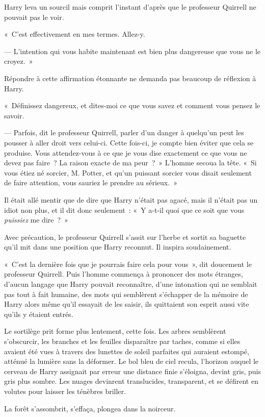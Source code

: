 Harry leva un sourcil mais comprit l'instant d'après que le professeur Quirrell ne pouvait pas le voir.

«~C'est effectivement en mes termes.
Allez-y.

--- L'intention qui vous habite maintenant est bien plus dangereuse que vous ne le croyez.~»

Répondre à cette affirmation étonnante ne demanda pas beaucoup de réflexion à Harry.

«~Définissez dangereux, et dites-moi ce que vous savez et comment vous pensez le savoir.

--- Parfois, dit le professeur Quirrell, parler d'un danger à quelqu'un peut les pousser à aller droit vers celui-ci.
Cette fois-ci, je compte bien éviter que cela se produise.
Vous attendez-vous à ce que je vous dise exactement ce que vous ne devez pas faire~?
La raison exacte de ma peur~?~»
L'homme secoua la tête.
«~Si vous étiez né sorcier, M. Potter, et qu'un puissant sorcier vous disait seulement de faire attention, vous sauriez le prendre au sérieux.~»

Il était allé mentir que de dire que Harry n'était pas agacé, mais il n'était pas un idiot non plus, et il dit donc seulement~: «~Y a-t-il quoi que ce soit que vous \emph{puissiez} me dire~?~»

Avec précaution, le professeur Quirrell s'assit sur l'herbe et sortit sa baguette qu'il mit dans une position que Harry reconnut.
Il inspira soudainement.

«~C'est la dernière fois que je pourrais faire cela pour vous~», dit doucement le professeur Quirrell.
Puis l'homme commença à prononcer des mots étranges, d'aucun langage que Harry pouvait reconnaître, d'une intonation qui ne semblait pas tout à fait humaine, des mots qui semblèrent s'échapper de la mémoire de Harry alors même qu'il essayait de les saisir, ils quittaient son esprit aussi vite qu'ils y étaient entrés.

Le sortilège prit forme plus lentement, cette fois.
Les arbres semblèrent s'obscurcir, les branches et les feuilles disparaître par taches, comme si elles avaient été vues à travers des lunettes de soleil parfaites qui auraient estompé, atténué la lumière sans la déformer.
Le bol bleu de ciel recula, l'horizon auquel le cerveau de Harry assignait par erreur une distance finie s'éloigna, devint gris, puis gris plus sombre.
Les nuages devinrent translucides, transparent, et se défirent en volutes pour laisser les ténèbres briller.

La forêt s'assombrit, s'effaça, plongea dans la noirceur.

